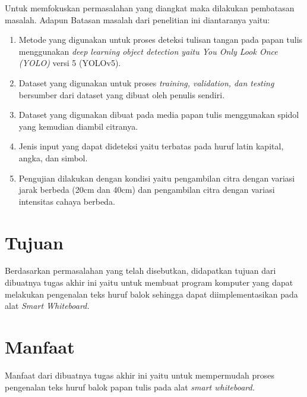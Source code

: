 Untuk memfokuskan permasalahan yang diangkat maka dilakukan pembatasan masalah. Adapun Batasan masalah dari penelitian ini diantaranya yaitu:
\begin{enumerate}[nolistsep]
    \item Metode yang digunakan untuk proses deteksi tulisan tangan pada papan tulis menggunakan \textit{deep learning object detection \textnormal{yaitu} You Only Look Once (YOLO)} versi 5 (YOLOv5).
    \item Dataset yang digunakan untuk proses \textit{training, validation, \textnormal{dan} testing} bersumber dari dataset yang dibuat oleh penulis sendiri.
    \item Dataset yang digunakan dibuat pada media papan tulis menggunakan spidol yang kemudian diambil citranya.
    \item Jenis input yang dapat dideteksi yaitu terbatas pada huruf latin kapital, angka, dan simbol.
    \item Pengujian dilakukan dengan kondisi yaitu pengambilan citra dengan variasi jarak berbeda (20cm dan 40cm) dan pengambilan citra dengan variasi intensitas cahaya berbeda. 
\end{enumerate} 

\section{Tujuan}
\label{sec:Tujuan}

Berdasarkan permasalahan yang telah disebutkan, didapatkan tujuan dari dibuatnya tugas akhir ini yaitu untuk membuat program komputer yang dapat melakukan pengenalan teks huruf balok sehingga dapat diimplementasikan pada alat \textit{Smart Whiteboard.}

\section{Manfaat}
\label{sec:manfaat}

Manfaat dari dibuatnya tugas akhir ini yaitu untuk mempermudah proses pengenalan teks huruf balok papan tulis pada alat \textit{smart whiteboard.}




